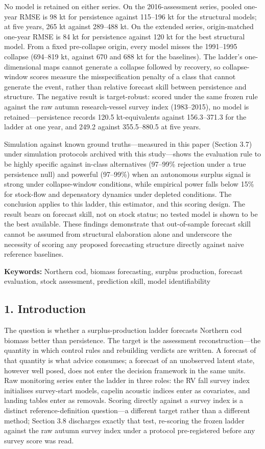 \documentclass[11pt]{article}
\begin{document}
No model is retained on either series. On the 2016-assessment series,
pooled one-year RMSE is 98 kt for persistence against 115--196 kt for
the structural models; at five years, 265 kt against 289--488 kt. On the
extended series, origin-matched one-year RMSE is 84 kt for persistence
against 120 kt for the best structural model. From a fixed pre-collapse
origin, every model misses the 1991--1995 collapse (694--819 kt, against
670 and 688 kt for the baselines). The ladder's one-dimensional maps
cannot generate a collapse followed by recovery, so collapse-window
scores measure the misspecification penalty of a class that cannot
generate the event, rather than relative forecast skill between
persistence and structure. The negative result is target-robust: scored
under the same frozen rule against the raw autumn research-vessel survey
index (1983--2015), no model is retained---persistence records 120.5
kt-equivalents against 156.3--371.3 for the ladder at one year, and
249.2 against 355.5--880.5 at five years.

Simulation against known ground truths---measured in this paper (Section
3.7) under simulation protocols archived with this study---shows the
evaluation rule to be highly specific against in-class alternatives
(97--99\% rejection under a true persistence null) and powerful
(97--99\%) when an autonomous surplus signal is strong under
collapse-window conditions, while empirical power falls below 15\% for
stock-flow and depensatory dynamics under depleted conditions. The
conclusion applies to this ladder, this estimator, and this scoring
design. The result bears on forecast skill, not on stock status; no
tested model is shown to be the best available. These findings
demonstrate that out-of-sample forecast skill cannot be assumed from
structural elaboration alone and underscore the necessity of scoring any
proposed forecasting structure directly against naive reference
baselines.

\textbf{Keywords:} Northern cod, biomass forecasting, surplus
production, forecast evaluation, stock assessment, prediction skill,
model identifiability

\subsection{1. Introduction}\label{introduction}

The question is whether a surplus-production ladder forecasts Northern
cod biomass better than persistence. The target is the assessment
reconstruction---the quantity in which control rules and rebuilding
verdicts are written. A forecast of that quantity is what advice
consumes; a forecast of an unobserved latent state, however well posed,
does not enter the decision framework in the same units. Raw monitoring
series enter the ladder in three roles: the RV fall survey index
initialises survey-start models, capelin acoustic indices enter as
covariates, and landing tables enter as removals. Scoring directly
against a survey index is a distinct reference-definition question---a
different target rather than a different method; Section 3.8 discharges
exactly that test, re-scoring the frozen ladder against the raw autumn
survey index under a protocol pre-registered before any survey score was
read.
\end{document}
